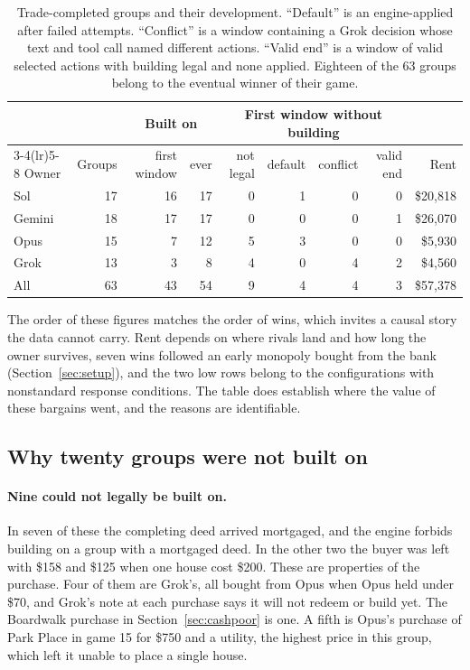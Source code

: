 \begin{table}[t]
\centering\small
\begin{tabular}{lrrrrrrrr}
\toprule
 & & \multicolumn{2}{c}{Built on} & \multicolumn{4}{c}{First window without building} & \\
\cmidrule(lr){3-4}\cmidrule(lr){5-8}
Owner & Groups & first window & ever & not legal & default & conflict & valid end & Rent\\
\midrule
Sol & 17 & 16 & 17 & 0 & 1 & 0 & 0 & \$20,818\\
Gemini & 18 & 17 & 17 & 0 & 0 & 0 & 1 & \$26,070\\
Opus & 15 & 7 & 12 & 5 & 3 & 0 & 0 & \$5,930\\
Grok & 13 & 3 & 8 & 4 & 0 & 4 & 2 & \$4,560\\
\midrule
All & 63 & 43 & 54 & 9 & 4 & 4 & 3 & \$57,378\\
\bottomrule
\end{tabular}
\caption{Trade-completed groups and their development. ``Default'' is an engine-applied \End{} after failed attempts. ``Conflict'' is a window containing a Grok decision whose text and tool call named different actions. ``Valid end'' is a window of valid selected actions with building legal and none applied. Eighteen of the 63 groups belong to the eventual winner of their game.}
\label{tab:conversion}
\end{table}

The order of these figures matches the order of wins, which invites a causal story the data cannot carry. Rent depends on where rivals land and how long the owner survives, seven wins followed an early monopoly bought from the bank (Section~\ref{sec:setup}), and the two low rows belong to the configurations with nonstandard response conditions. The table does establish where the value of these bargains went, and the reasons are identifiable.

\subsection{Why twenty groups were not built on}

\paragraph{Nine could not legally be built on.} In seven of these the completing deed arrived mortgaged, and the engine forbids building on a group with a mortgaged deed. In the other two the buyer was left with \$158 and \$125 when one house cost \$200. These are properties of the purchase. Four of them are Grok's, all bought from Opus when Opus held under \$70, and Grok's note at each purchase says it will not redeem or build yet. The Boardwalk purchase in Section~\ref{sec:cashpoor} is one. A fifth is Opus's purchase of Park Place in game 15 for \$750 and a utility, the highest price in this group, which left it unable to place a single house.

